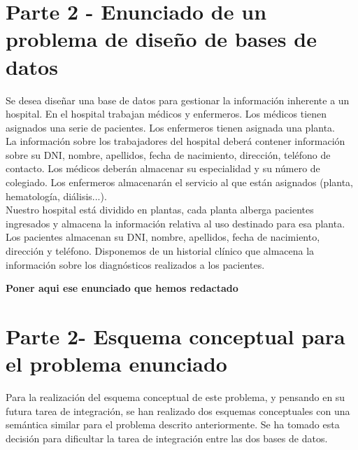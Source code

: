 \documentclass{article}
\begin{document}
\section{Parte 2 - Enunciado de un problema de diseño de bases de datos}

Se desea diseñar una base de datos para gestionar la información inherente a un hospital. En el hospital trabajan médicos y enfermeros. Los médicos tienen asignados una serie de pacientes. Los enfermeros tienen asignada una planta.\\
La información sobre los trabajadores del hospital deberá contener información sobre su DNI, nombre, apellidos, fecha de nacimiento, dirección, teléfono de contacto. Los médicos deberán almacenar su especialidad y su número de colegiado. Los enfermeros almacenarán el servicio al que están asignados (planta, hematología, diálisis...).\\
Nuestro hospital está dividido en plantas, cada planta alberga pacientes ingresados y almacena la información relativa al uso destinado para esa planta.\\
Los pacientes almacenan su DNI, nombre, apellidos, fecha de nacimiento, dirección y teléfono. Disponemos de un historial clínico que almacena la información sobre los diagnósticos realizados a los pacientes.

\textbf{Poner aqui ese enunciado que hemos redactado}

\section{Parte 2- Esquema conceptual para el problema enunciado}

Para la realización del esquema conceptual de este problema, y pensando en su futura tarea de integración, se han realizado dos esquemas conceptuales con una semántica similar para el problema descrito anteriormente. Se ha tomado esta decisión para dificultar la tarea de integración entre las dos bases de datos.\\
\end{document}
